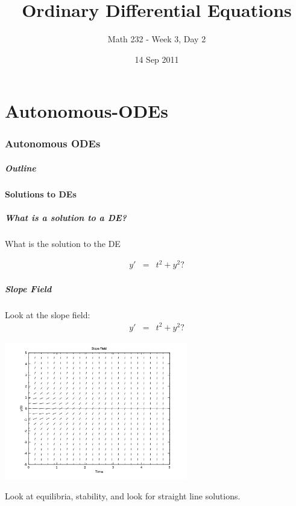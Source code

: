 \part{Autonomous-ODEs}
\section{Autonomous ODEs}

\title{Ordinary Differential Equations}
\subtitle{Math 232 - Week 3, Day 2}
\date{14 Sep 2011}

\begin{frame}
  \titlepage
\end{frame}

\begin{frame}
  \frametitle{Outline}
\end{frame}


\subsection{Solutions to DEs}


\begin{frame}
  \frametitle{What is a solution to a DE?}

  What is the solution to the DE

  \begin{eqnarray*}
    y' & = & t^2 + y^2?
  \end{eqnarray*}



\end{frame}


\begin{frame}
  \frametitle{Slope Field}

  Look at the slope field:
  \begin{eqnarray*}
    y' & = & t^2 + y^2?
  \end{eqnarray*}


  \includegraphics[height=6cm]{week3-D3SlopeExample}

  Look at equilibria, stability, and look for straight line solutions.

\end{frame}


